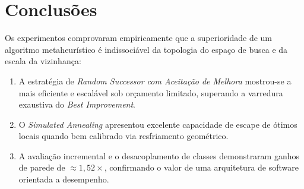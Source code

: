 \documentclass[11pt,a4paper]{article}
\begin{document}
\section{Conclusões}

Os experimentos comprovaram empiricamente que a superioridade de um algoritmo metaheurístico é indissociável da topologia do espaço de busca e da escala da vizinhança:
\begin{enumerate}
    \item A estratégia de \emph{Random Successor com Aceitação de Melhora} mostrou-se a mais eficiente e escalável sob orçamento limitado, superando a varredura exaustiva do \emph{Best Improvement}.
    \item O \emph{Simulated Annealing} apresentou excelente capacidade de escape de ótimos locais quando bem calibrado via resfriamento geométrico.
    \item A avaliação incremental e o desacoplamento de classes demonstraram ganhos de parede de $\approx 1{,}52\times$, confirmando o valor de uma arquitetura de software orientada a desempenho.
\end{enumerate}
\end{document}

